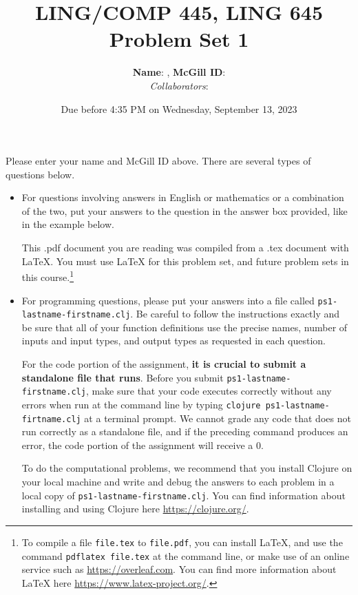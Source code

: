\documentclass[10pt]{article}
\author{
  \textbf{Name}:       %
, \textbf{McGill ID}:  %
\\ \textit{Collaborators}:  %
}
\newcommand{\PSnum}{1}
\begin{document}
\title{LING/COMP 445, LING 645\\Problem Set \PSnum} \date{Due before 4:35 PM on
Wednesday, September 13, 2023} 
\maketitle 

Please enter your name and McGill ID
above. There are several types of questions below.
\begin{itemize}
  \item For questions involving answers in English or mathematics or a
    combination of the two, put your answers to the question in the answer box
    provided, like in the example below.

    This .pdf document you are reading was compiled from a .tex document with
    \LaTeX. You must use \LaTeX{} for this problem set, and future problem sets
    in this course.\footnote{To compile a file \texttt{file.tex} to
      \texttt{file.pdf}, you can install \LaTeX{}, and use the command
      \texttt{pdflatex file.tex} at the command line, or make use of an online
      service such as \url{https://overleaf.com}. You can find more information
    about \LaTeX{} here \url{https://www.latex-project.org/}.}

  \item For programming questions, please put your answers into a file called
    \texttt{ps\PSnum-lastname-firstname.clj}. Be careful to follow the
    instructions exactly and be sure that all of your function definitions use
    the precise names, number of inputs and input types, and output types as
    requested in each question.

    For the code portion of the assignment, \textbf{it is crucial to submit a
    standalone file that runs}. Before you submit
    \texttt{ps\PSnum-lastname-firstname.clj}, make sure that your code executes
    correctly without any errors when run at the command line by typing
    \texttt{clojure ps\PSnum-lastname-firtname.clj} at a terminal prompt. We
    cannot grade any code that does not run correctly as a standalone file, and
    if the preceding command produces an error, the code portion of the
    assignment will receive a $0$.

    To do the computational problems, we recommend that you install Clojure on
    your local machine and write and debug the answers to each problem in a
    local copy of \texttt{ps\PSnum-lastname-firstname.clj}. You can find
    information about installing and using Clojure here
    \url{https://clojure.org/}.
\end{itemize}
\end{document}
